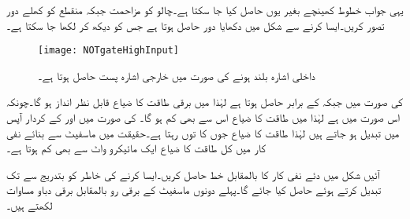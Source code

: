 یہی جواب خطوط کھینچے بغیر  یوں حاصل کیا جا سکتا ہے۔چالو  کو مزاحمت  جبکہ منقطع  کو کھلے دور تصور کریں۔ایسا کرنے سے شکل  میں دکھایا دور حاصل ہوتا ہے جس کو دیکھ کر   لکھا جا سکتا ہے۔ 

\begin{figure}
\centering
\texttt{[image: NOTgateHighInput]}
\caption{داخلی اشارہ بلند ہونے کی صورت میں خارجی اشارہ پست حاصل ہوتا ہے۔}
\label{شکل_ماسفیٹ_نفی_کار_داخلی_بلند_خارجی_پست}
\end{figure}

 کی صورت میں  جبکہ  کے برابر حاصل ہوتا ہے لہٰذا  میں برقی طاقت کا ضیاع قابل نظر انداز ہو گا۔چونکہ اس صورت میں  ہے لہٰذا  میں طاقت کا ضیاع اس سے بھی کم ہو گا۔ کی صورت میں  اور  کے کردار آپس میں تبدیل ہو جاتے ہیں لہٰذا طاقت کا ضیاع جوں کا توں رہتا ہے۔حقیقت میں ماسفیٹ سے بنائے نفی کار میں کل طاقت کا ضیاع ایک مائیکرو واٹ سے بھی کم ہوتا ہے۔ 

آئیں شکل  میں دئے نفی کار کا  بالمقابل  خط حاصل کریں۔ایسا کرنے کی خاطر  کو بتدریج  سے   تک  تبدیل کرتے ہوئے  حاصل کیا جائے گا۔پہلے  دونوں ماسفیٹ کے برقی رو بالمقابل برقی دباو مساوات  لکھتے ہیں۔


